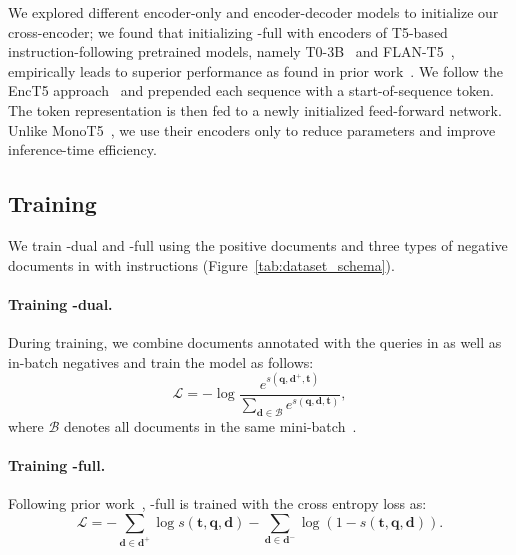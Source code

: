 We explored different encoder-only and encoder-decoder models to initialize our cross-encoder; we found that initializing \model-full with encoders of T5-based instruction-following pretrained models, {namely T0-3B~\cite{sanh2022multitask} and FLAN-T5~\cite{flan_palm}, empirically leads to superior performance as found in prior work~\cite{sachan2022improving}.}
We follow the EncT5 approach~\cite{liu2021enct5} and prepended each sequence with a start-of-sequence token. 
The token representation is then fed to a newly initialized feed-forward network. 
Unlike MonoT5~\cite{nogueira-etal-2020-document}, we use their encoders only to reduce parameters and improve inference-time efficiency. 


\subsection{Training \model}
\label{sec:training}
We train \model-dual and \model-full using the positive documents and {three types of negative documents
in \rib with instructions} (Figure~\ref{tab:dataset_schema}).  

\paragraph{Training \model-dual.}
During training, we combine documents annotated with the queries in \rib as well as in-batch negatives and train the model as follows: 
\begin{equation*}
    \mathcal{L} = - \log \frac{e^{s(\boldsymbol{q},\boldsymbol{d}^{+}, \boldsymbol{t})}}{\sum_{\boldsymbol{d} \in \mathcal{B}} e^{ s(\boldsymbol{q},\boldsymbol{d}, \boldsymbol{t})} },
\end{equation*}
where $\mathcal{B}$ denotes all documents in the same mini-batch~\cite{karpukhin-etal-2020-dense}.


\paragraph{Training \model-full.}
Following prior work~\cite{nogueira2019passage}, \model-full is trained with the cross entropy loss as:
\begin{equation*}
    \mathcal{L} =-\sum_{\boldsymbol{d} \in \boldsymbol{d}^{+}} \log s(\boldsymbol{t}, \boldsymbol{q}, \boldsymbol{d}) -\sum_{\boldsymbol{d} \in \boldsymbol{d}^{-}} \log (1 - s(\boldsymbol{t}, \boldsymbol{q}, \boldsymbol{d})).
\end{equation*}


